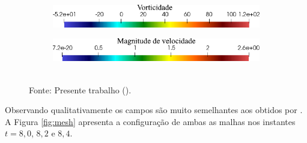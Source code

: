 \begin{figure}[h!]
\begin{subfigure}{.49\linewidth}
    \end{subfigure}
    \caption*{Instante $t=8,8$.}
    \begin{subfigure}{.49\linewidth}
        \centering
        \includegraphics[width=\linewidth]{Figuras/rotating-airfoil/lvort.png}
    \end{subfigure}
    \begin{subfigure}{.49\linewidth}
        \centering
        \includegraphics[width=\linewidth]{Figuras/rotating-airfoil/lstr.png}
    \end{subfigure}
    \\Fonte: Presente trabalho (\the\year).
    \label{fig:vort}
\end{figure}

Observando qualitativamente os campos são muito semelhantes aos obtidos por . A Figura \ref{fig:mesh} apresenta a configuração de ambas as malhas nos instantes $t=8,0$, $8,2$ e $8,4$.

